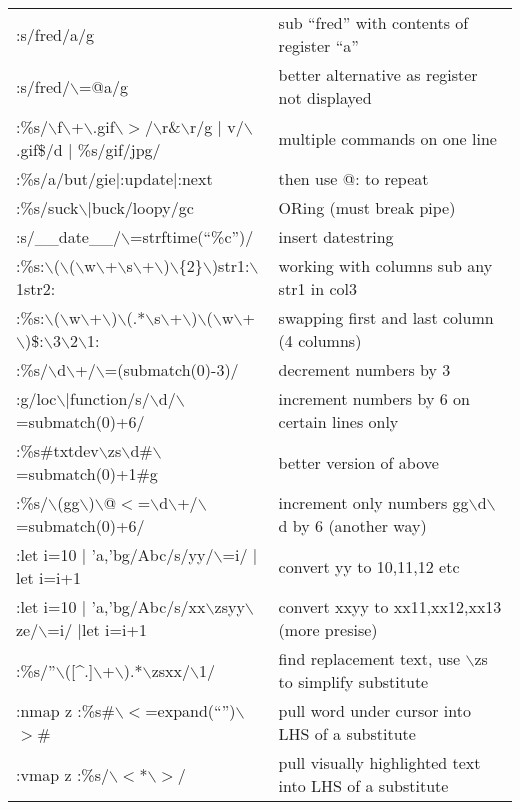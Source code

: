 \documentclass[10pt]{article}
\begin{document}
\begin{center}
\begin{longtable}{l|l}
 :s/fred/a/g & sub ``fred'' with contents of register ``a''\\ 
 :s/fred/$\backslash$=@a/g & better alternative as register not displayed\\ 
 :\%s/$\backslash$f$\backslash$+$\backslash$.gif$\backslash$$>$/$\backslash$r\&$\backslash$r/g $|$ v/$\backslash$.gif\$/d $|$ \%s/gif/jpg/ & multiple commands on one line\\ 
 :\%s/a/but/gie$|$:update$|$:next & then use @: to repeat\\ 
 :\%s/suck$\backslash$$|$buck/loopy/gc & ORing (must break pipe)\\ 
 :s/\_\_date\_\_/$\backslash$=strftime(``\%c'')/ & insert datestring\\ 
 :\%s:$\backslash$($\backslash$($\backslash$w$\backslash$+$\backslash$s$\backslash$+$\backslash$)$\backslash$\{2\}$\backslash$)str1:$\backslash$1str2: & working with columns sub any str1 in col3\\ 
 :\%s:$\backslash$($\backslash$w$\backslash$+$\backslash$)$\backslash$(.*$\backslash$s$\backslash$+$\backslash$)$\backslash$($\backslash$w$\backslash$+$\backslash$)\$:$\backslash$3$\backslash$2$\backslash$1: & swapping first and last column (4 columns)\\ 
 :\%s/$\backslash$d$\backslash$+/$\backslash$=(submatch(0)-3)/ & decrement numbers by 3\\
 :g/loc$\backslash$$|$function/s/$\backslash$d/$\backslash$=submatch(0)+6/ & increment numbers by 6 on certain lines only\\ 
 :\%s\#txtdev$\backslash$zs$\backslash$d\#$\backslash$=submatch(0)+1\#g & better version of above\\ 
 :\%s/$\backslash$(gg$\backslash$)$\backslash$@$<$=$\backslash$d$\backslash$+/$\backslash$=submatch(0)+6/ & increment only numbers gg$\backslash$d$\backslash$d by 6 (another way)\\ 
 :let i=10 $|$ 'a,'bg/Abc/s/yy/$\backslash$=i/ $|$let i=i+1 & convert yy to 10,11,12 etc\\ 
 :let i=10 $|$ 'a,'bg/Abc/s/xx$\backslash$zsyy$\backslash$ze/$\backslash$=i/ $|$let i=i+1 & convert xxyy to xx11,xx12,xx13 (more presise) \\ 
 :\%s/''$\backslash$([\^{}.]$\backslash$+$\backslash$).*$\backslash$zsxx/$\backslash$1/ & find replacement text, use $\backslash$zs to simplify substitute\\ 
 :nmap z :\%s\#$\backslash$$<$=expand(``'')$\backslash$$>$\# & pull word under cursor into LHS of a substitute\\ 
 :vmap z :\%s/$\backslash$$<$*$\backslash$$>$/ & pull visually highlighted text into LHS of a substitute
\end{longtable}
\end{center}
\end{document}
